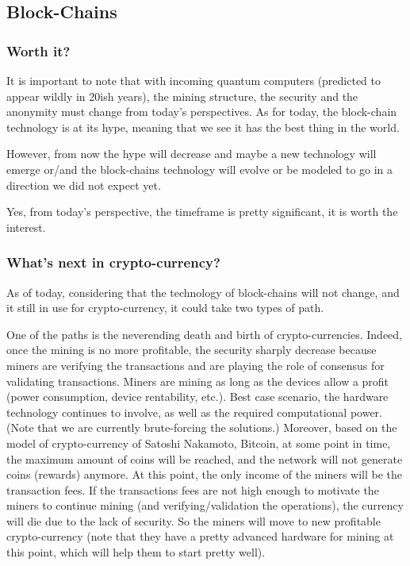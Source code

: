 
\subsection{Block-Chains}
\subsubsection{Worth it?}
It is important to note that with incoming quantum computers (predicted to appear wildly in 20ish years), the mining structure, the security and the anonymity must change from today's perspectives. 
As for today, the block-chain technology is at its hype, meaning that we see it has the best thing in the world.

However, from now the hype will decrease and maybe a new technology will emerge or/and the block-chains technology will evolve or be modeled to go in a direction we did not expect yet.

Yes, from today's perspective, the timeframe is pretty significant, it is worth the interest.

\subsubsection{What's next in crypto-currency?}

As of today, considering that the technology of block-chains will not change, and it still in use for crypto-currency, it could take two types of path.

One of the paths is the neverending death and birth of crypto-currencies. Indeed, once the mining is no more profitable, the security sharply decrease because miners are verifying the transactions and are playing the role of consensus for validating transactions. Miners are mining as long as the devices allow a profit (power consumption, device rentability, etc.). Best case scenario, the hardware technology continues to involve, as well as the required computational power. (Note that we are currently brute-forcing the solutions.) Moreover, based on the model of crypto-currency of Satoshi Nakamoto, Bitcoin, at some point in time, the maximum amount of coins will be reached, and the network will not generate coins (rewards) anymore. At this point, the only income of the miners will be the transaction fees. If the transactions fees are not high enough to motivate the miners to continue mining (and verifying/validation the operations), the currency will die due to the lack of security. So the miners will move to new profitable crypto-currency (note that they have a pretty advanced hardware for mining at this point, which will help them to start pretty well).

